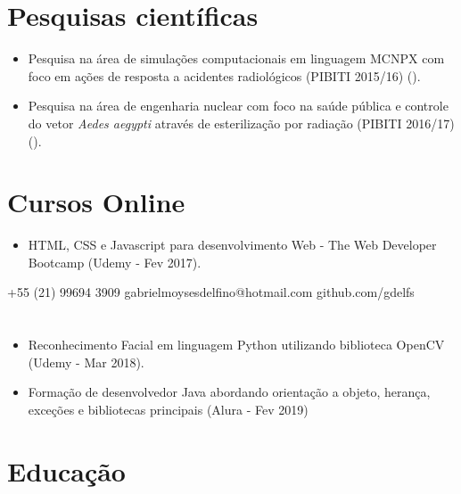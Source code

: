 \documentclass{tccv}
\begin{document}
\section{Pesquisas científicas}

    \begin{itemize}
        \item Pesquisa na área de simulações computacionais em linguagem MCNPX com foco em ações de resposta a acidentes radiológicos (PIBITI 2015/16)  (\href{https://github.com/gdelfs/Simualacoes-Computacionais-em-MCNPX}{\faCode}).
        \item  Pesquisa na área de engenharia nuclear com foco na saúde pública e controle do vetor \textit{Aedes aegypti} através de esterilização por radiação (PIBITI 2016/17) (\href{https://github.com/gdelfs/Esterilizacao-Aedes-Aegypti-com-radiacao}{\faCode}).
    \end{itemize}


\section{Cursos Online}
    \begin{itemize}
        \item HTML, CSS e Javascript para desenvolvimento Web - The Web Developer Bootcamp (Udemy - Fev 2017).  
    \end{itemize}
        
        {+55 (21) 99694 3909} %
        {gabrielmoysesdelfino@hotmail.com} %
        {github.com/gdelfs} %
        
\section{}
\newline
      \begin{itemize}  
        \item Reconhecimento Facial em linguagem Python utilizando biblioteca OpenCV (Udemy - Mar 2018).
        \item Formação de desenvolvedor Java abordando orientação a objeto, herança, exceções e bibliotecas principais (Alura - Fev 2019)
    \end{itemize}




\section{Educação}
\end{document}
